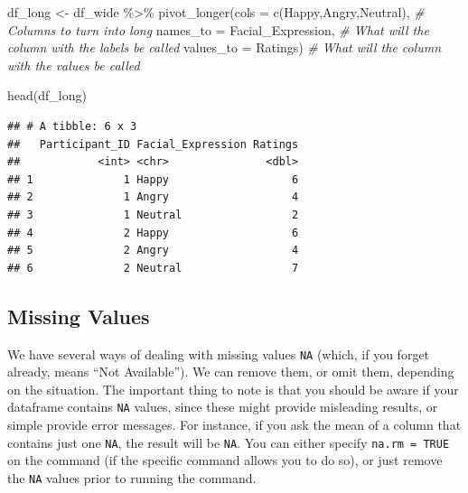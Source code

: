 \documentclass[
]{book}
\newenvironment{Shaded}{\begin{snugshade}}{\end{snugshade}}
\newcommand{\AttributeTok}[1]{\textcolor[rgb]{0.77,0.63,0.00}{#1}}
\newcommand{\CommentTok}[1]{\textcolor[rgb]{0.56,0.35,0.01}{\textit{#1}}}
\newcommand{\FunctionTok}[1]{\textcolor[rgb]{0.00,0.00,0.00}{#1}}
\newcommand{\NormalTok}[1]{#1}
\newcommand{\OtherTok}[1]{\textcolor[rgb]{0.56,0.35,0.01}{#1}}
\newcommand{\SpecialCharTok}[1]{\textcolor[rgb]{0.00,0.00,0.00}{#1}}
\newcommand{\StringTok}[1]{\textcolor[rgb]{0.31,0.60,0.02}{#1}}
\begin{document}
\begin{Shaded}
\begin{Highlighting}[]
\NormalTok{df\_long }\OtherTok{\textless{}{-}}\NormalTok{ df\_wide }\SpecialCharTok{\%\textgreater{}\%} 
  \FunctionTok{pivot\_longer}\NormalTok{(}\AttributeTok{cols =} \FunctionTok{c}\NormalTok{(}\StringTok{\textquotesingle{}Happy\textquotesingle{}}\NormalTok{,}\StringTok{\textquotesingle{}Angry\textquotesingle{}}\NormalTok{,}\StringTok{\textquotesingle{}Neutral\textquotesingle{}}\NormalTok{),  }\CommentTok{\# Columns to turn into long}
               \AttributeTok{names\_to =} \StringTok{\textquotesingle{}Facial\_Expression\textquotesingle{}}\NormalTok{,  }\CommentTok{\# What will the column with the labels be called}
               \AttributeTok{values\_to =} \StringTok{\textquotesingle{}Ratings\textquotesingle{}}\NormalTok{)  }\CommentTok{\# What will the column with the values be called}

\FunctionTok{head}\NormalTok{(df\_long)}
\end{Highlighting}
\end{Shaded}

\begin{verbatim}
## # A tibble: 6 x 3
##   Participant_ID Facial_Expression Ratings
##            <int> <chr>               <dbl>
## 1              1 Happy                   6
## 2              1 Angry                   4
## 3              1 Neutral                 2
## 4              2 Happy                   6
## 5              2 Angry                   4
## 6              2 Neutral                 7
\end{verbatim}

\hypertarget{missing-values}{%
\subsection{Missing Values}\label{missing-values}}

We have several ways of dealing with missing values \texttt{NA} (which, if you forget already, means ``Not Available'').
We can remove them, or omit them, depending on the situation.
The important thing to note is that you should be aware if your dataframe contains \texttt{NA} values, since these might provide misleading results, or simple provide error messages.
For instance, if you ask the mean of a column that contains just one \texttt{NA}, the result will be \texttt{NA}.
You can either specify \texttt{na.rm\ =\ TRUE} on the command (if the specific command allows you to do so), or just remove the \texttt{NA} values prior to running the command.
\end{document}
